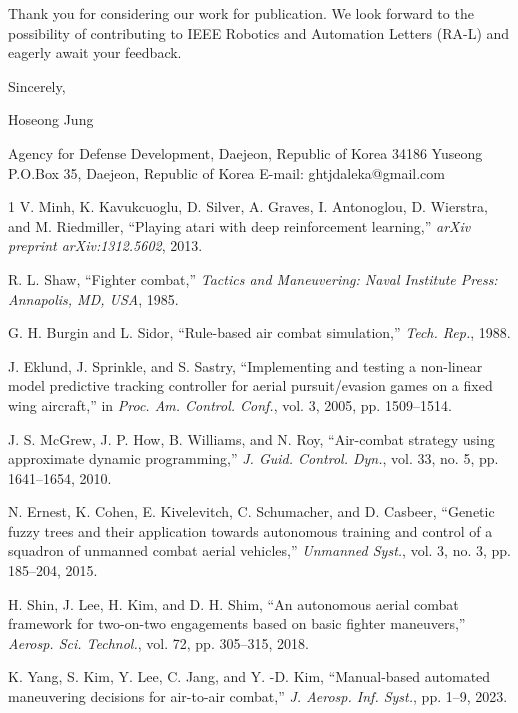 Thank you for considering our work for publication. We look forward to the possibility of contributing to IEEE Robotics and Automation Letters (RA-L) and eagerly await your feedback.

Sincerely,

Hoseong Jung

Agency for Defense Development, Daejeon, Republic of Korea
34186 Yuseong P.O.Box 35, Daejeon, Republic of Korea
E-mail: ghtjdaleka@gmail.com

\begin{thebibliography}{1}
    V. Minh, K. Kavukcuoglu, D. Silver, A. Graves, I. Antonoglou, D. Wierstra, and M. Riedmiller, ``Playing atari with deep reinforcement learning,'' \emph{arXiv preprint arXiv:1312.5602}, 2013.

    R. L. Shaw, ``Fighter combat,'' \emph{Tactics and Maneuvering: Naval Institute Press: Annapolis, MD, USA}, 1985.

    G. H. Burgin and L. Sidor, ``Rule-based air combat simulation,'' \emph{Tech. Rep.}, 1988.

    J. Eklund, J. Sprinkle, and S. Sastry, ``Implementing and testing a non-linear model predictive tracking controller for aerial pursuit/evasion games on a fixed wing aircraft,'' in \emph{Proc. Am. Control. Conf.}, vol. 3, 2005, pp. 1509--1514.

    J. S. McGrew, J. P. How, B. Williams, and N. Roy, ``Air-combat strategy using approximate dynamic programming,'' \emph{J. Guid. Control. Dyn.}, vol. 33, no. 5, pp. 1641--1654, 2010.

    N. Ernest, K. Cohen, E. Kivelevitch, C. Schumacher, and D. Casbeer, ``Genetic fuzzy trees and their application towards autonomous training and control of a squadron of unmanned combat aerial vehicles,'' \emph{Unmanned Syst.}, vol. 3, no. 3, pp. 185--204, 2015.

    H. Shin, J. Lee, H. Kim, and D. H. Shim, ``An autonomous aerial combat framework for two-on-two engagements based on basic fighter maneuvers,'' \emph{Aerosp. Sci. Technol.}, vol. 72, pp. 305--315, 2018.

    K. Yang, S. Kim, Y. Lee, C. Jang, and Y. -D. Kim, ``Manual-based automated maneuvering decisions for air-to-air combat,'' \emph{J. Aerosp. Inf. Syst.}, pp. 1--9, 2023.


\end{thebibliography}
